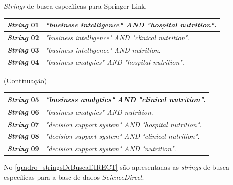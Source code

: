 \begin{quadro}[htb]
\caption{\label{quadro_stringsDeBuscaSPRINGER}\textit{Strings} de busca específicas para Springer Link.}
\label{}
\begin{tabular}{|p{2cm}|p{11cm}|}
	\hline
	\textbf{\textit{String} 01}	& \textit{"business intelligence" AND "hospital nutrition"}.\\ \hline
	\textbf{\textit{String} 02}	& \textit{"business intelligence" AND "clinical nutrition"}.\\ \hline
	\textbf{\textit{String} 03}	& \textit{"business intelligence" AND nutrition}. \\ \hline
	\textbf{\textit{String} 04}	& \textit{"business analytics" AND "hospital nutrition"}.	\\ \hline
\end{tabular}
\end{quadro}
\begin{quadro}[htb]
\label{}(Continuação)
\begin{tabular}{|p{2cm}|p{11cm}|}
    \hline
    \textbf{\textit{String} 05}	& \textit{"business analytics" AND "clinical nutrition"}. \\ \hline
    \textbf{\textit{String} 06}	& \textit{"business analytics" AND nutrition}. \\ \hline
    \textbf{\textit{String} 07}	& \textit{"decision support system" AND "hospital nutrition"}.\\ \hline
    \textbf{\textit{String} 08}	& \textit{"decision support system" AND "clinical nutrition"}.\\ \hline
    \textbf{\textit{String} 09}	& \textit{"decision support system" AND "nutrition"}.\\ \hline
\end{tabular}
\end{quadro}

No \autoref{quadro_stringsDeBuscaDIRECT} são apresentadas as \textit{strings} de busca específicas para a base de dados \textit{ScienceDirect}.

